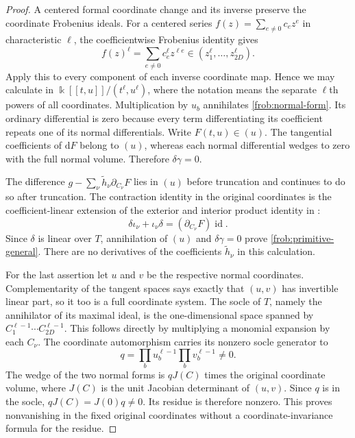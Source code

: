 \begin{proof}
A centered formal coordinate change and its inverse preserve the
coordinate Frobenius ideals.  For a centered series
$f(z)=\sum_{e\ne0}c_ez^e$ in characteristic $\ell$, the coefficientwise
Frobenius identity gives
\[
 f(z)^\ell=\sum_{e\ne0}c_e^\ell z^{\ell e}
                          \in(z_1^\ell,\ldots,z_{2D}^\ell).
\]
Apply this to every component of each inverse coordinate map.  Hence
we may calculate in $\Bbbk[[t,u]]/(t^\ell,u^\ell)$, where the
notation means the separate $\ell$th powers of all coordinates.
Multiplication by $u_b$ annihilates \eqref{frob:normal-form}.  Its ordinary
differential is zero because every term differentiating its coefficient
repeats one of its normal differentials.  Write $F(t,u)\in(u)$.  The
tangential coefficients of $\mathrm dF$ belong to $(u)$, whereas each
normal differential wedges to zero with the full normal volume.
Therefore $\delta\gamma=0$.

The difference
$g-\sum_\nu\widetilde h_\nu\partial_{C_\nu}F$ lies in $(u)$ before
truncation and continues to do so after truncation.  The contraction
identity in the original coordinates is the coefficient-linear
extension of the exterior and interior product identity in
\cite[Section~2, p.~72, (2.9)]{Koszul1950}:
\begin{equation}
 \delta\iota_\nu+\iota_\nu\delta
                         =(\partial_{C_\nu}F)\operatorname{id}.
 \label{frob:contraction}
\end{equation}
Since $\delta$ is linear over $T$, annihilation of $(u)$ and
$\delta\gamma=0$ prove \eqref{frob:primitive-general}.  There are no
derivatives of the coefficients $\widetilde h_\nu$ in this calculation.

For the last assertion let $u$ and $v$ be the respective normal
coordinates.  Complementarity of the tangent spaces says exactly that
$(u,v)$ has invertible linear part, so it too is a full coordinate
system.  The socle of $T$, namely the annihilator of its maximal ideal,
is the one-dimensional space spanned by
$C_1^{\ell-1}\cdots C_{2D}^{\ell-1}$.  This follows directly by
multiplying a monomial expansion by each $C_\nu$.  The coordinate
automorphism carries its nonzero socle generator to
\[
             q=\prod_b u_b^{\ell-1}\prod_b v_b^{\ell-1}\ne0.
\]
The wedge of the two normal forms is $qJ(C)$ times the original
coordinate volume, where $J(C)$ is the unit Jacobian determinant of
$(u,v)$.  Since $q$ is in the socle, $qJ(C)=J(0)q\ne0$.  Its residue
is therefore nonzero.  This proves nonvanishing in the fixed original
coordinates without a coordinate-invariance formula for the residue.
\end{proof}

